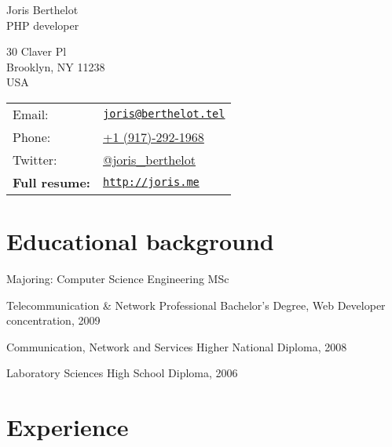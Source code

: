 \documentclass[letterpaper]{article}
\def\name{Joris Berthelot}
\def\title{PHP developer}
\renewenvironment{itemize}{
    \begin{list}{}{
        \setlength{\leftmargin}{1.5em}
    }
}{
    \end{list}
}
\begin{document}
    
    {\Huge \name} \\
    {\Large \title}
    
    
    \vspace{0.25in}
    
    \begin{minipage}{0.6\linewidth}
        30 Claver Pl \\
        Brooklyn, NY 11238 \\
        USA \\
    \end{minipage}
    \begin{minipage}{0.5\linewidth}
        \begin{tabular}{ll}
            Email: & \href{mailto:joris@berthelot.tel}{\tt joris@berthelot.tel} \\
            Phone: & \href{callto:19172921968}{+1 (917)-292-1968} \\
            Twitter: & \href{http://twitter.com/joris_berthelot}{@joris\_berthelot} \\
            \textbf{Full resume:} & \href{http://joris.me}{\tt http://joris.me}
        \end{tabular}
    \end{minipage}
    
    \section*{Educational background}
        
        \begin{itemize}
            \item Majoring: Computer Science Engineering MSc
            \item Telecommunication \& Network Professional Bachelor's Degree, Web Developer concentration, 2009
            \item Communication, Network and Services Higher National Diploma, 2008
            \item Laboratory Sciences High School Diploma, 2006
        \end{itemize}
        
    \section*{Experience}
        
\end{document}
